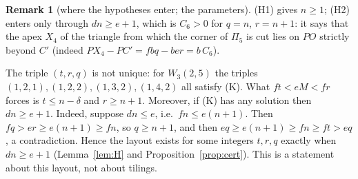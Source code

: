 \documentclass[11pt,reqno]{amsart}
\theoremstyle{plain}
\theoremstyle{definition}
\newtheorem{remark}[theorem]{Remark}
\begin{document}
\begin{remark}[where the hypotheses enter; the parameters]\label{rem:params}
(H1) gives $n\ge1$; (H2) enters only through $dn\ge e+1$, which is $C_6>0$ for $q=n$, $r=n+1$: it says that the apex $X_4$ of the triangle from which the corner of $\Pi_5$ is cut lies on $PO$ strictly beyond $C'$ (indeed $PX_4-PC'=fbq-ber=b\,C_6$).

The triple $(t,r,q)$ is not unique: for $W_3(2,5)$ the triples $(1,2,1),(1,2,2),(1,3,2),(1,4,2)$ all satisfy (K). What $ft<eM<fr$ forces is $t\le n-\delta$ and $r\ge n+1$. Moreover, if (K) has any solution then $dn\ge e+1$. Indeed, suppose $dn\le e$, i.e.\ $fn\le e(n+1)$. Then $fq>er\ge e(n+1)\ge fn$, so $q\ge n+1$, and then $eq\ge e(n+1)\ge fn\ge ft>eq$, a contradiction. Hence the layout exists for some integers $t,r,q$ exactly when $dn\ge e+1$ (Lemma~\ref{lem:H} and Proposition~\ref{prop:cert}). This is a statement about this layout, not about tilings.
\end{remark}

\end{document}
